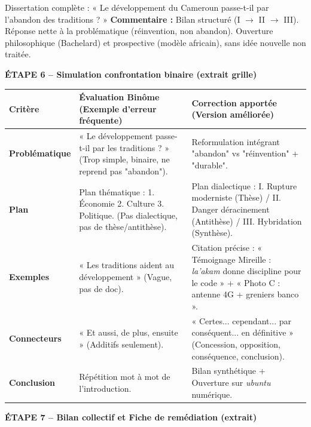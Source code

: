 \documentclass[11pt]{article}
\begin{document}
\begin{exoresolu}{Dissertation complète : « Le développement du Cameroun passe-t-il par l'abandon des traditions ? »}
\textbf{Commentaire :} Bilan structuré (I $\rightarrow$ II $\rightarrow$ III). Réponse nette à la problématique (réinvention, non abandon). Ouverture philosophique (Bachelard) et prospective (modèle africain), sans idée nouvelle non traitée.

\textbf{ÉTAPE 6 -- Simulation confrontation binaire (extrait grille)}

\begin{center}
\begin{tabularx}{\linewidth}{|l|X|X|}\hline
\textbf{Critère} & \textbf{Évaluation Binôme (Exemple d'erreur fréquente)} & \textbf{Correction apportée (Version améliorée)} \\ \hline
\textbf{Problématique} & « Le développement passe-t-il par les traditions ? » (Trop simple, binaire, ne reprend pas "abandon"). & Reformulation intégrant "abandon" vs "réinvention" + "durable". \\ \hline
\textbf{Plan} & Plan thématique : 1. Économie 2. Culture 3. Politique. (Pas dialectique, pas de thèse/antithèse). & Plan dialectique : I. Rupture moderniste (Thèse) / II. Danger déracinement (Antithèse) / III. Hybridation (Synthèse). \\ \hline
\textbf{Exemples} & « Les traditions aident au développement » (Vague, pas de doc). & Citation précise : « Témoignage Mireille : \emph{la'akam} donne discipline pour le code » + « Photo C : antenne 4G + greniers banco ». \\ \hline
\textbf{Connecteurs} & « Et aussi, de plus, ensuite » (Additifs seulement). & « Certes... cependant... par conséquent... en définitive » (Concession, opposition, conséquence, conclusion). \\ \hline
\textbf{Conclusion} & Répétition mot à mot de l'introduction. & Bilan synthétique + Ouverture sur \emph{ubuntu} numérique. \\ \hline
\end{tabularx}
\end{center}

\textbf{ÉTAPE 7 -- Bilan collectif et Fiche de remédiation (extrait)}


\end{exoresolu}
\end{document}
